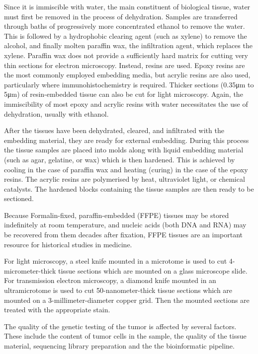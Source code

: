 Since it is immiscible with water, the main constituent of biological tissue,
water must first be removed in the process of dehydration. Samples are
transferred through baths of progressively more concentrated ethanol to remove
the water. This is followed by a hydrophobic clearing agent (such as xylene) to
remove the alcohol, and finally molten paraffin wax, the infiltration agent,
which replaces the xylene. Paraffin wax does not provide a sufficiently hard
matrix for cutting very thin sections for electron microscopy. Instead, resins
are used. Epoxy resins are the most commonly employed embedding media, but
acrylic resins are also used, particularly where immunohistochemistry is
required. Thicker sections (0.35μm to 5μm) of resin-embedded tissue can also be
cut for light microscopy. Again, the immiscibility of most epoxy and acrylic
resins with water necessitates the use of dehydration, usually with ethanol.

After the tissues have been dehydrated, cleared, and infiltrated with the
embedding material, they are ready for external embedding. During this process
the tissue samples are placed into molds along with liquid embedding material
(such as agar, gelatine, or wax) which is then hardened. This is achieved by
cooling in the case of paraffin wax and heating (curing) in the case of the
epoxy resins. The acrylic resins are polymerised by heat, ultraviolet light, or
chemical catalysts. The hardened blocks containing the tissue samples are then
ready to be sectioned.

Because Formalin-fixed, paraffin-embedded (FFPE) tissues may be stored
indefinitely at room temperature, and nucleic acids (both DNA and RNA) may be
recovered from them decades after fixation, FFPE tissues are an important
resource for historical studies in medicine.

For light microscopy, a steel knife mounted in a microtome is used to cut
4-micrometer-thick tissue sections which are mounted on a glass microscope
slide. For transmission electron microscopy, a diamond knife mounted in an
ultramicrotome is used to cut 50-nanometer-thick tissue sections which are
mounted on a 3-millimeter-diameter copper grid. Then the mounted sections are
treated with the appropriate stain.

The quality of the genetic testing of the tumor is affected by several factors.
These include the content of tumor cells in the sample, the quality of the
tissue material, sequencing library preparation and the the bioinformatic
pipeline.

